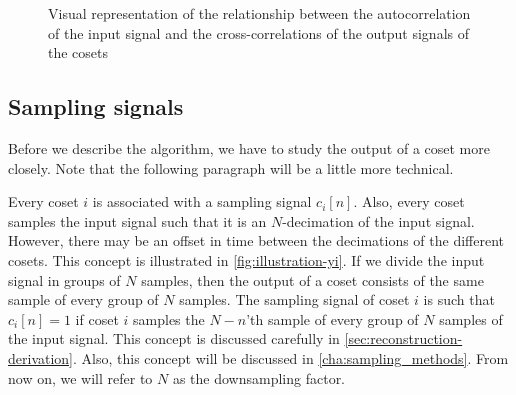 \documentclass[a4paper, openany, oneside]{memoir}
\begin{document}
\begin{figure}[h]
\centering
{}
\caption{Visual representation of the relationship between the autocorrelation of the input signal and the cross-correlations of the output signals of the cosets}\label{tkz:overview-vars}
\end{figure}

\subsection{Sampling signals}
Before we describe the algorithm, we have to study the output of a coset more closely. Note that the following paragraph will be a little more technical.

Every coset $i$ is associated with a sampling signal $c_i[n]$. Also, every coset samples the input signal such that it is an $N$-decimation of the input signal. However, there may be an offset in time between the decimations of the different cosets. This concept is illustrated in \cref{fig:illustration-yi}. If we divide the input signal in groups of $N$ samples, then the output of a coset consists of the same sample of every group of $N$ samples.  The sampling signal of coset $i$ is such that $c_i[n]=1$ if coset $i$ samples the $N-n$'th sample of every group of $N$ samples of the input signal. This concept is discussed carefully in \cref{sec:reconstruction-derivation}. Also, this concept will be discussed in \cref{cha:sampling_methods}. From now on, we will refer to $N$ as the downsampling factor.
\end{document}
